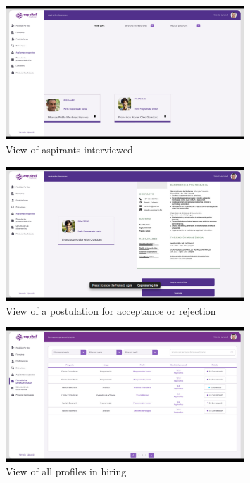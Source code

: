 \documentclass{scrreprt}
\begin{document}
\begin{figure}[H]
	\centering \small
	\includegraphics[width=0.8\textwidth]{WebPrototype/wflow-32.jpeg}
	\caption{View of aspirants interviewed}
\end{figure}

\begin{figure}[H]
	\centering \small
	\includegraphics[width=0.8\textwidth]{WebPrototype/wflow-33.jpeg}
	\caption{View of a postulation for acceptance or rejection}
\end{figure}

\begin{figure}[H]
	\centering \small
	\includegraphics[width=0.8\textwidth]{WebPrototype/wflow-34.jpeg}
	\caption{View of all profiles in hiring}
\end{figure}
\end{document}
